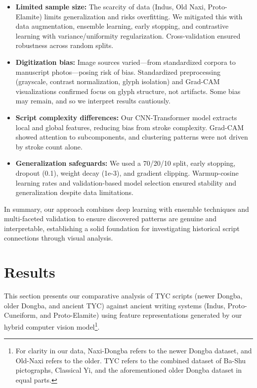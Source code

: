 \documentclass[11pt,a4paper,oneside]{report}
\begin{document}
\begin{itemize}

    \item \textbf{Limited sample size:} The scarcity of data (Indus, Old Naxi, Proto-Elamite) limits generalization and risks overfitting. We mitigated this with data augmentation, ensemble learning, early stopping, and contrastive learning with variance/uniformity regularization. Cross-validation ensured robustness across random splits.

    \item \textbf{Digitization bias:} Image sources varied—from standardized corpora to manuscript photos—posing risk of bias. Standardized preprocessing (grayscale, contrast normalization, glyph isolation) and Grad-CAM visualizations confirmed focus on glyph structure, not artifacts. Some bias may remain, and so we interpret results cautiously.

    \item \textbf{Script complexity differences:} Our CNN-Transformer model extracts local and global features, reducing bias from stroke complexity. Grad-CAM showed attention to subcomponents, and clustering patterns were not driven by stroke count alone.

    \item \textbf{Generalization safeguards:} We used a 70/20/10 split, early stopping, dropout (0.1), weight decay (1e-3), and gradient clipping. Warmup-cosine learning rates and validation-based model selection ensured stability and generalization despite data limitations.

\end{itemize}

In summary, our approach combines deep learning with ensemble techniques and multi-faceted validation to ensure discovered patterns are genuine and interpretable, establishing a solid foundation for investigating historical script connections through visual analysis.

\chapter{Results}
\label{results}
\noindent\hspace{1cm}
This section presents our comparative analysis of TYC scripts (newer Dongba, older Dongba, and ancient TYC) against ancient writing systems (Indus, Proto-Cuneiform, and Proto-Elamite) using feature representations generated by our hybrid computer vision model\footnote{For clarity in our data, Naxi-Dongba refers to the newer Dongba dataset, and Old-Naxi refers to the older. TYC refers to the combined dataset of Ba-Shu pictographs, Classical Yi, and the aforementioned older Dongba dataset in equal parts.}.
\end{document}
